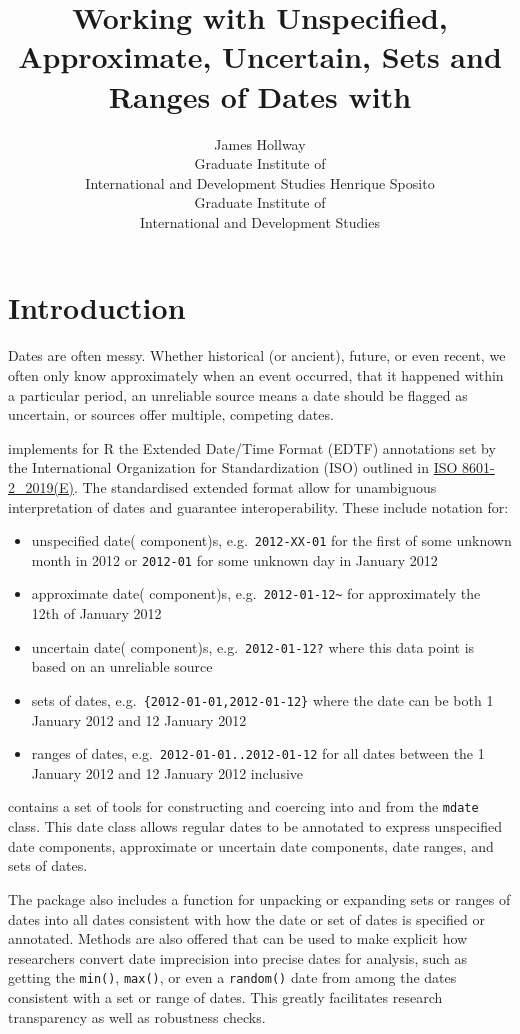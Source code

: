 \documentclass[
]{jss}
\author{
James Hollway\\Graduate Institute of\\
International and Development Studies \And Henrique Sposito\\Graduate
Institute of\\
International and Development Studies
}
\title{Working with Unspecified, Approximate, Uncertain, Sets and Ranges
of Dates with \pkg{messydates}}
\providecommand{\tightlist}{%
  \setlength{\itemsep}{0pt}\setlength{\parskip}{0pt}}
\begin{document}
\hypertarget{introduction}{%
\section{Introduction}\label{introduction}}

Dates are often messy. Whether historical (or ancient), future, or even
recent, we often only know approximately when an event occurred, that it
happened within a particular period, an unreliable source means a date
should be flagged as uncertain, or sources offer multiple, competing
dates.

 implements for R the Extended Date/Time Format (EDTF)
annotations set by the International Organization for Standardization
(ISO) outlined in \href{https://www.iso.org/standard/70908.html}{ISO
8601-2\_2019(E)}. The standardised extended format allow for unambiguous
interpretation of dates and guarantee interoperability. These include
notation for:

\begin{itemize}
\tightlist
\item
  unspecified date( component)s, e.g.~\texttt{2012-XX-01} for the first
  of some unknown month in 2012 or \texttt{2012-01} for some unknown day
  in January 2012
\item
  approximate date( component)s,
  e.g.~\texttt{2012-01-12\textasciitilde{}} for approximately the 12th
  of January 2012
\item
  uncertain date( component)s, e.g.~\texttt{2012-01-12?} where this data
  point is based on an unreliable source
\item
  sets of dates, e.g.~\texttt{\{2012-01-01,2012-01-12\}} where the date
  can be both 1 January 2012 and 12 January 2012
\item
  ranges of dates, e.g.~\texttt{2012-01-01..2012-01-12} for all dates
  between the 1 January 2012 and 12 January 2012 inclusive
\end{itemize}

 contains a set of tools for constructing and coercing
into and from the \texttt{mdate} class. This date class allows regular
dates to be annotated to express unspecified date components,
approximate or uncertain date components, date ranges, and sets of
dates.

The package also includes a function for unpacking or expanding sets or
ranges of dates into all dates consistent with how the date or set of
dates is specified or annotated. Methods are also offered that can be
used to make explicit how researchers convert date imprecision into
precise dates for analysis, such as getting the \texttt{min()},
\texttt{max()}, or even a \texttt{random()} date from among the dates
consistent with a set or range of dates. This greatly facilitates
research transparency as well as robustness checks.
\end{document}
